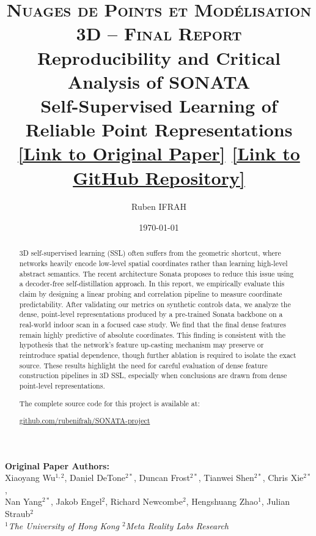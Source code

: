 \documentclass[11pt, a4paper]{article}
\title{
    \textsc{\large Nuages de Points et Modélisation 3D -- Final Report} \\
    \vspace{0.8cm}
    \textbf{Reproducibility and Critical Analysis of SONATA}\\
    \large Self-Supervised Learning of Reliable Point Representations\\
    \vspace{1ex}
\normalsize \href{https://arxiv.org/pdf/2503.16429}{[Link to Original Paper]} \quad \href{https://github.com/rubenifrah/SONATA-project}{[Link to GitHub Repository]}}
\author[1]{Ruben IFRAH}
\affil[1]{\normalsize Master IASD, Dauphine-PSL}
\date{\today} %
\begin{document}
\maketitle

\vspace{0.5cm}
\begin{center}
    \textbf{Original Paper Authors:}\\
    Xiaoyang Wu$^{1,2}$, Daniel DeTone$^{2*}$, Duncan Frost$^{2*}$, Tianwei Shen$^{2*}$, Chris Xie$^{2*}$,\\
    Nan Yang$^{2*}$, Jakob Engel$^{2}$, Richard Newcombe$^{2}$, Hengshuang Zhao$^{1}$, Julian Straub$^{2}$\\
    \vspace{1ex}
    \textit{\small $^{1}$The University of Hong Kong \quad $^{2}$Meta Reality Labs Research}
\end{center}
\vspace{1.5cm}


\begin{abstract}
3D self-supervised learning (SSL) often suffers from the geometric shortcut, where networks heavily encode low-level spatial coordinates rather than learning high-level abstract semantics. The recent architecture Sonata proposes to reduce this issue using a decoder-free self-distillation approach. In this report, we empirically evaluate this claim by designing a linear probing and correlation pipeline to measure coordinate predictability. After validating our metrics on synthetic controls data, we analyze the dense, point-level representations produced by a pre-trained Sonata backbone on a real-world indoor scan in a focused case study. We find that the final dense features remain highly predictive of absolute coordinates. This finding is consistent with the hypothesis that the network's feature up-casting mechanism may preserve or reintroduce spatial dependence, though further ablation is required to isolate the exact source. These results highlight the need for careful evaluation of dense feature construction pipelines in 3D SSL, especially when conclusions are drawn from dense point-level representations.

The complete source code for this project is available at:


\centering
\href{https://github.com/rubenifrah/SONATA-project}{github.com/rubenifrah/SONATA-project}
\end{abstract}

\newpage

\tableofcontents
\newpage
\end{document}
